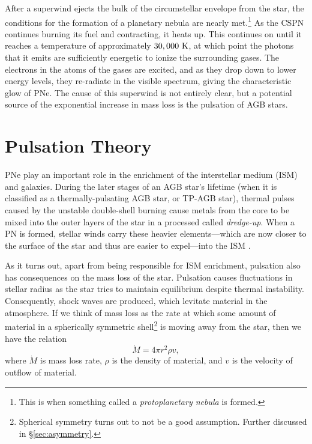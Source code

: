 \documentclass[twocolumn]{aastex63}
\begin{document}
After a superwind ejects the bulk of the circumstellar envelope from the star, the conditions for the formation of a planetary nebula are nearly met.\footnote{This is when something called a \textit{protoplanetary nebula} is formed.} As the CSPN continues burning its fuel and contracting, it heats up. This continues on until it reaches a temperature of approximately $30,000~{\rm K}$, at which point the photons that it emits are sufficiently energetic to ionize the surrounding gases. The electrons in the atoms of the gases are excited, and as they drop down to lower energy levels, they re-radiate in the visible spectrum, giving the characteristic glow of PNe. The cause of this superwind is not entirely clear, but a potential source of the exponential increase in mass loss is the pulsation of AGB stars. 



\section{Pulsation Theory} \label{sec:pulsation}
PNe play an important role in the enrichment of the interstellar medium (ISM) and galaxies. During the later stages of an AGB star's lifetime (when it is classified as a thermally-pulsating AGB star, or TP-AGB star), thermal pulses caused by the unstable double-shell burning cause metals from the core to be mixed into the outer layers of the star in a processed called \textit{dredge-up}. When a PN is formed, stellar winds carry these heavier elements—which are now closer to the surface of the star and thus are easier to expel—into the ISM \citep{iben}. 

As it turns out, apart from being responsible for ISM enrichment, pulsation also has consequences on the mass loss of the star. Pulsation causes fluctuations in stellar radius as the star tries to maintain equilibrium despite thermal instability. Consequently, shock waves are produced, which levitate material in the atmosphere. If we think of mass loss as the rate at which some amount of material in a spherically symmetric shell\footnote{Spherical symmetry turns out to not be a good assumption. Further discussed in \S \ref{sec:asymmetry}.} is moving away from the star, then we have the relation
\begin{equation}\label{eq:mlshell}
    \dot M = 4\pi r^2 \rho v,
\end{equation}
where $\dot M$ is mass loss rate, $\rho$ is the density of material, and $v$ is the velocity of outflow of material. 
\end{document}
